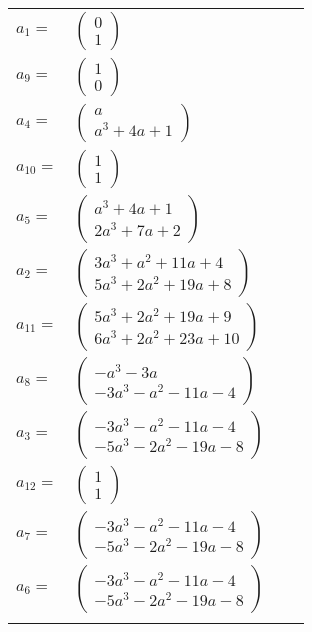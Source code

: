 \documentclass[1p]{elsarticle_modified}
\theoremstyle{definition}
\begin{document}
\begin{tabular}{m{7pt} m{180pt} m{7pt} m{180pt} }
\flushright $a_{1}=$&$\begin{pmatrix}0\\1\end{pmatrix}$ \\
\flushright $a_{9}=$&$\begin{pmatrix}1\\0\end{pmatrix}$ \\
\flushright $a_{4}=$&$\begin{pmatrix}a\\a^3+4 a+1\end{pmatrix}$ \\
\flushright $a_{10}=$&$\begin{pmatrix}1\\1\end{pmatrix}$ \\
\flushright $a_{5}=$&$\begin{pmatrix}a^3+4 a+1\\2 a^3+7 a+2\end{pmatrix}$ \\
\flushright $a_{2}=$&$\begin{pmatrix}3 a^3+a^2+11 a+4\\5 a^3+2 a^2+19 a+8\end{pmatrix}$ \\
\flushright $a_{11}=$&$\begin{pmatrix}5 a^3+2 a^2+19 a+9\\6 a^3+2 a^2+23 a+10\end{pmatrix}$ \\
\flushright $a_{8}=$&$\begin{pmatrix}- a^3-3 a\\-3 a^3- a^2-11 a-4\end{pmatrix}$ \\
\flushright $a_{3}=$&$\begin{pmatrix}-3 a^3- a^2-11 a-4\\-5 a^3-2 a^2-19 a-8\end{pmatrix}$ \\
\flushright $a_{12}=$&$\begin{pmatrix}1\\1\end{pmatrix}$ \\
\flushright $a_{7}=$&$\begin{pmatrix}-3 a^3- a^2-11 a-4\\-5 a^3-2 a^2-19 a-8\end{pmatrix}$ \\
\flushright $a_{6}=$&$\begin{pmatrix}-3 a^3- a^2-11 a-4\\-5 a^3-2 a^2-19 a-8\end{pmatrix}$\\&\end{tabular}
\end{document}
